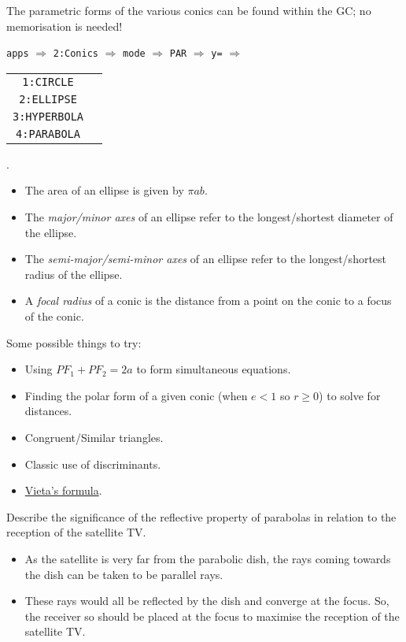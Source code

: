 \documentclass[oneside]{book}
\begin{document}
\begin{GCSkills}{}
  The parametric forms of the various conics can be found within the GC; no memorisation is needed!
  \begin{center}
    \texttt{apps} \(\Longrightarrow\) \texttt{2:Conics} \(\Longrightarrow\) \texttt{mode} \(\Longrightarrow\)  \texttt{PAR} \(\Longrightarrow\) \texttt{y=} \(\Longrightarrow\) 
    \begin{tabular}{Sc}
      \texttt{1:CIRCLE}\\
      \texttt{2:ELLIPSE}\\
      \texttt{3:HYPERBOLA}\\
      \texttt{4:PARABOLA}
    \end{tabular}.
  \end{center}
\end{GCSkills}
  \begin{note}
    \begin{itemize}[label=\(\circ\)]
      \item The area of an ellipse is given by \(\pi ab\).
      \item The \emph{major/minor axes} of an ellipse refer to the longest/shortest diameter of the ellipse. 
      \item The \emph{semi-major/semi-minor axes} of an ellipse refer to the longest/shortest radius of the ellipse. 
      \item A \emph{focal radius} of a conic is the distance from a point on the conic to a focus of the conic.
    \end{itemize}
  \end{note}
  \begin{note}
    Some possible things to try:
    \begin{itemize}
      \item Using \(PF_1+PF_2=2a\) to form simultaneous equations.
      \item Finding the polar form of a given conic (when \(e<1\) so \(r \geq 0\)) to solve for distances.
      \item Congruent/Similar triangles.
      \item Classic use of discriminants.
      \item \hyperlink{vieta}{Vieta's formula}.
    \end{itemize}
  \end{note}
  \begin{example}{}{}
    Describe the significance of the reflective property of parabolas in relation to the reception of the satellite TV.
    \begin{itemize}
      \item As the satellite is very far from the parabolic dish, the rays coming towards the dish can be taken to be parallel rays.
      \item These rays would all be reflected by the dish and converge at the focus. So, the receiver so should be placed at the focus to maximise the reception of the satellite TV. 
    \end{itemize}
  \end{example}
\end{document}
